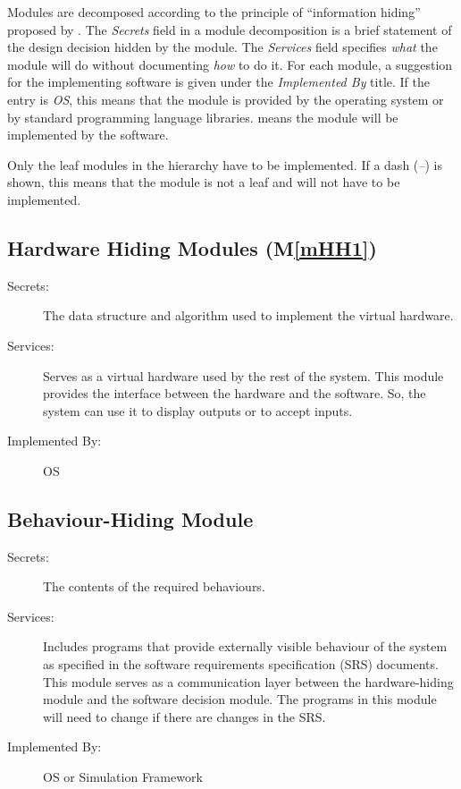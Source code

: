 \documentclass[12pt, titlepage]{article}
\newcommand{\mref}[1]{M\ref{#1}}
\begin{document}
Modules are decomposed according to the principle of ``information hiding''
proposed by \citet{ParnasEtAl1984}. The \emph{Secrets} field in a module
decomposition is a brief statement of the design decision hidden by the
module. The \emph{Services} field specifies \emph{what} the module will do
without documenting \emph{how} to do it. For each module, a suggestion for the
implementing software is given under the \emph{Implemented By} title. If the
entry is \emph{OS}, this means that the module is provided by the operating
system or by standard programming language libraries.  \emph{\progname{}} means the
module will be implemented by the \progname{} software.

Only the leaf modules in the hierarchy have to be implemented. If a dash
(\emph{--}) is shown, this means that the module is not a leaf and will not have
to be implemented.

\subsection{Hardware Hiding Modules (\mref{mHH1})}

\begin{description}
\item[Secrets:]The data structure and algorithm used to implement the virtual
  hardware.
\item[Services:]Serves as a virtual hardware used by the rest of the
  system. This module provides the interface between the hardware and the
  software. So, the system can use it to display outputs or to accept inputs.
\item[Implemented By:] OS
\end{description}

\subsection{Behaviour-Hiding Module}

\begin{description}
\item[Secrets:]The contents of the required behaviours.
\item[Services:]Includes programs that provide externally visible behaviour of
  the system as specified in the software requirements specification (SRS)
  documents. This module serves as a communication layer between the
  hardware-hiding module and the software decision module. The programs in this
  module will need to change if there are changes in the SRS.
\item[Implemented By:] OS or Simulation Framework
\end{description}
\end{document}
